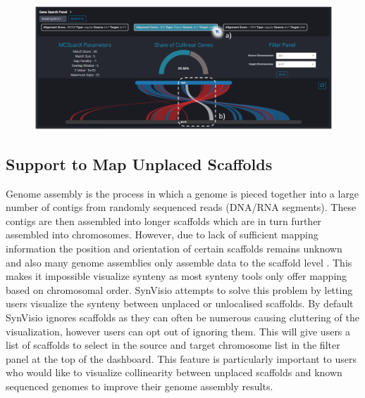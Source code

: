 \begin{figure}
  \centering
  \includegraphics[width=1\linewidth]{images/ch_5_gene_serach.PNG}
  \label{fig:ch_5_gene_serach}
\end{figure}


\subsection{Support to Map Unplaced Scaffolds}
Genome assembly is the process in which a genome is pieced together into a large number of contigs from randomly sequenced reads (DNA/RNA segments)\cite{hunt2014comprehensive}. These contigs are then assembled into longer scaffolds which are in turn further assembled into chromosomes. However, due to lack of sufficient mapping information the position and orientation of certain scaffolds remains unknown and also many genome assemblies only assemble data to the scaffold level \cite{ensembl}. This makes it impossible visualize synteny as most synteny tools only offer mapping based on chromosomal order. SynVisio attempts to solve this problem by letting users visualize the synteny between unplaced or unlocalised scaffolds. By default SynVisio ignores scaffolds as they can often be numerous causing cluttering of the visualization, however users can opt out of ignoring them. This will give users a list of scaffolds to select in the source and target chromosome list in the filter panel at the top of the dashboard. This feature is particularly important to users who would like to visualize collinearity between unplaced scaffolds and known sequenced genomes to improve their genome assembly results. 


